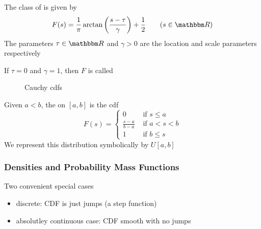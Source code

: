 \begin{frame}

    \Eg
    The class of  is given by 
    \begin{equation*}
        F(s) 
        = \frac{1}{\pi} \arctan\left(  \frac{s - \tau}{\gamma} \right) 
            + \frac{1}{2}
       \qquad (s \in \RR)
    \end{equation*}
    The parameters $\tau \in \RR$ and $\gamma > 0$ are the location
    and scale parameters respectively
    
    If $\tau=0$ and $\gamma=1$, then $F$ is called

\end{frame}

\begin{frame}

    \begin{figure}
       \begin{center}
        \caption{\label{f:cauchy_cdfs} Cauchy {\sc cdf}s }
       \end{center}
    \end{figure}
    
\end{frame}

\begin{frame}

    \vspace{2em}
    \Eg
    Given $a < b$, the  on $[a, b]$ is the
    {\sc cdf} 
    \begin{equation*}
        F(s) = 
        \begin{cases}
            0 & \text{ if } s \leq a
            \\
            \frac{s-a}{b-a} & \text{ if } a < s < b
            \\
            1   & \text{ if }  b \leq s
        \end{cases}
    \end{equation*}
    We represent this distribution symbolically by $U[a, b]$
        
\end{frame}

\begin{frame}

    \frametitle{Densities and Probability Mass Functions}

    Two convenient special cases
    \begin{itemize}
        \item discrete: CDF is just jumps (a step function) 
        \item absolutley continuous case: CDF smooth with no jumps
    \end{itemize}

\end{frame}

